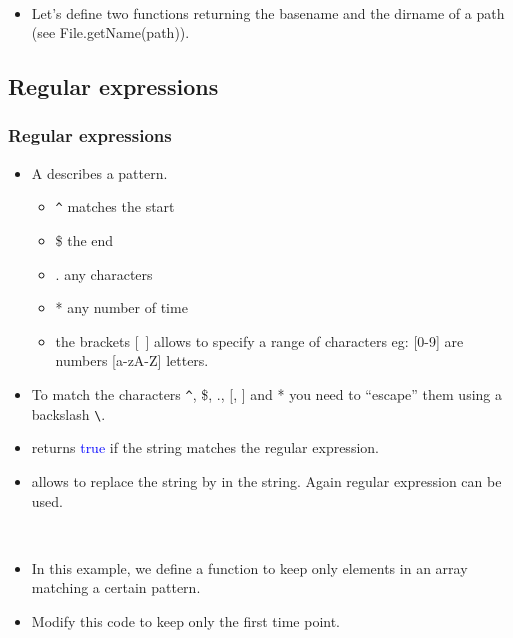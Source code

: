 \begin{frame}[fragile]
  \begin{example}~\par
    \begin{itemize}
    \item Let's define two functions returning the basename and the
      dirname of a path (see File.getName(path)).~\par
      
    \end{itemize}
  \end{example}
\end{frame}

\subsection{Regular expressions}
\begin{frame}[fragile]
  \frametitle<presentation>{Regular expressions}
  \begin{itemize}
  \item  A  describes a pattern.
    \begin{itemize}
    \item \verb?^? matches the start
    \item \$ the end
    \item . any characters
    \item * any number of time
    \item the brackets [~] allows to specify a range of characters eg:
      [0-9] are numbers [a-zA-Z] letters.
    \end{itemize}
  \item To match the characters \verb?^?, \$, ., [, ] and * you need to
    ``escape'' them using a backslash \verb?\?.
  \item {} returns \textcolor{blue}{true}
    if the string matches the regular expression.
  \item {} allows to replace the string
     by  in the string. Again regular expression
    can be used.
  \end{itemize}
\end{frame}

\begin{frame}
  \begin{example}~\par
    \begin{itemize}
    \item In this example, we define a function to keep only elements
      in an array matching a certain pattern.\par
      
    \item Modify this code to keep only the first time point.
    \end{itemize}
  \end{example}
\end{frame}

